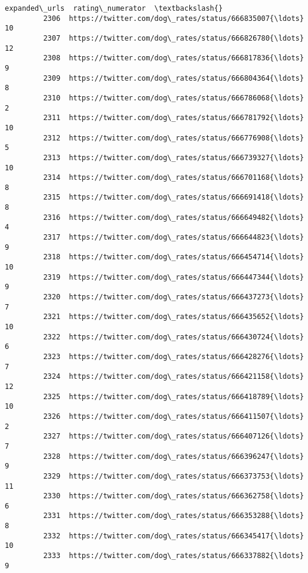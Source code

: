 \documentclass[11pt]{article}
\begin{document}
\begin{Verbatim}[commandchars=\\\{\}]
                                                   expanded\_urls  rating\_numerator  \textbackslash{}
         2306  https://twitter.com/dog\_rates/status/666835007{\ldots}                10   
         2307  https://twitter.com/dog\_rates/status/666826780{\ldots}                12   
         2308  https://twitter.com/dog\_rates/status/666817836{\ldots}                 9   
         2309  https://twitter.com/dog\_rates/status/666804364{\ldots}                 8   
         2310  https://twitter.com/dog\_rates/status/666786068{\ldots}                 2   
         2311  https://twitter.com/dog\_rates/status/666781792{\ldots}                10   
         2312  https://twitter.com/dog\_rates/status/666776908{\ldots}                 5   
         2313  https://twitter.com/dog\_rates/status/666739327{\ldots}                10   
         2314  https://twitter.com/dog\_rates/status/666701168{\ldots}                 8   
         2315  https://twitter.com/dog\_rates/status/666691418{\ldots}                 8   
         2316  https://twitter.com/dog\_rates/status/666649482{\ldots}                 4   
         2317  https://twitter.com/dog\_rates/status/666644823{\ldots}                 9   
         2318  https://twitter.com/dog\_rates/status/666454714{\ldots}                10   
         2319  https://twitter.com/dog\_rates/status/666447344{\ldots}                 9   
         2320  https://twitter.com/dog\_rates/status/666437273{\ldots}                 7   
         2321  https://twitter.com/dog\_rates/status/666435652{\ldots}                10   
         2322  https://twitter.com/dog\_rates/status/666430724{\ldots}                 6   
         2323  https://twitter.com/dog\_rates/status/666428276{\ldots}                 7   
         2324  https://twitter.com/dog\_rates/status/666421158{\ldots}                12   
         2325  https://twitter.com/dog\_rates/status/666418789{\ldots}                10   
         2326  https://twitter.com/dog\_rates/status/666411507{\ldots}                 2   
         2327  https://twitter.com/dog\_rates/status/666407126{\ldots}                 7   
         2328  https://twitter.com/dog\_rates/status/666396247{\ldots}                 9   
         2329  https://twitter.com/dog\_rates/status/666373753{\ldots}                11   
         2330  https://twitter.com/dog\_rates/status/666362758{\ldots}                 6   
         2331  https://twitter.com/dog\_rates/status/666353288{\ldots}                 8   
         2332  https://twitter.com/dog\_rates/status/666345417{\ldots}                10   
         2333  https://twitter.com/dog\_rates/status/666337882{\ldots}                 9   

\end{Verbatim}
\end{document}
